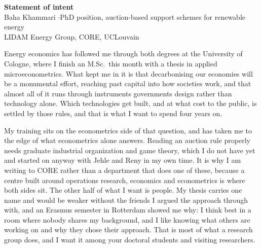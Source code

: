 \documentclass[a4paper,11pt]{article}
\newcommand{\sh}[1]{\vspace{1.2mm}\noindent{\small\bfseries #1}\par\vspace{-0.15em}}
\begin{document}
\begin{center}
{\large\bfseries Statement of intent}\\[3pt]
{\small Baha Khammari \quad$\cdot$\quad PhD position, auction-based support schemes for renewable energy}\\
{\small LIDAM Energy Group, CORE, UCLouvain}
\end{center}

\vspace{3mm}

\sh{Why this doctorate}
Energy economics has followed me through both degrees at the University of Cologne, where I finish an M.Sc.\ this month with a thesis in applied microeconometrics. What kept me in it is that decarbonising our economies will be a monumental effort, reaching past capital into how societies work, and that almost all of it runs through instruments governments design rather than technology alone. Which technologies get built, and at what cost to the public, is settled by those rules, and that is what I want to spend four years on.

\sh{Why CORE}
My training sits on the econometrics side of that question, and has taken me to the edge of what econometrics alone answers. Reading an auction rule properly needs graduate industrial organization and game theory, which I do not have yet and started on anyway with Jehle and Reny in my own time. It is why I am writing to CORE rather than a department that does one of these, because a centre built around operations research, economics and econometrics is where both sides sit. The other half of what I want is people. My thesis carries one name and would be weaker without the friends I argued the approach through with, and an Erasmus semester in Rotterdam showed me why: I think best in a room where nobody shares my background, and I like knowing what others are working on and why they chose their approach. That is most of what a research group does, and I want it among your doctoral students and visiting researchers.
\end{document}
